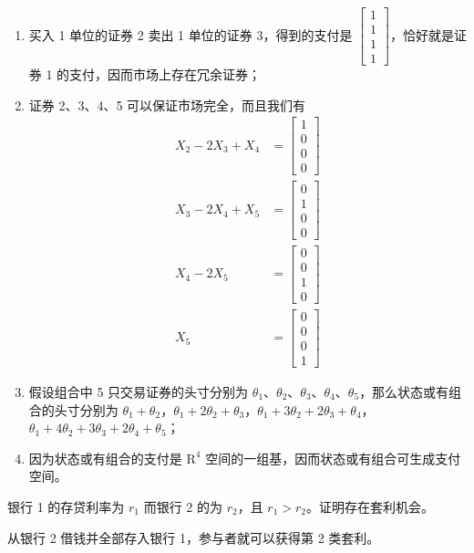 \begin{solution}
\begin{enumerate}[label=(\alph*)]
    \item 买入 1 单位的证券 2 卖出 1 单位的证券 3，得到的支付是 $\begin{bmatrix}1 \\ 1 \\ 1 \\ 1\end{bmatrix}$，恰好就是证券 1 的支付，因而市场上存在冗余证券；
    \item 证券 2、3、4、5 可以保证市场完全，而且我们有
    \[
        \begin{aligned}
            X_{2}-2X_{3}+X_{4}&=\begin{bmatrix}1 \\ 0 \\ 0 \\ 0\end{bmatrix}\\
            X_{3}-2X_{4}+X_{5}&=\begin{bmatrix}0 \\ 1 \\ 0 \\ 0\end{bmatrix}\\
            X_{4}-2X_{5}&=\begin{bmatrix}0 \\ 0 \\ 1 \\ 0\end{bmatrix}\\
            X_{5}&=\begin{bmatrix}0 \\ 0 \\ 0 \\ 1\end{bmatrix}
        \end{aligned}
    \]
    \item 假设组合中 5 只交易证券的头寸分别为 $\theta_{1}$、$\theta_{2}$、$\theta_{3}$、$\theta_{4}$、$\theta_{5}$，那么状态或有组合的头寸分别为 $\theta_{1}+\theta_{2}$，$\theta_{1}+2\theta_{2}+\theta_{3}$，$\theta_{1}+3\theta_{2}+2\theta_{3}+\theta_{4}$，$\theta_{1}+4\theta_{2}+3\theta_{3}+2\theta_{4}+\theta_{5}$；
    \item 因为状态或有组合的支付是 $\mathrm{R}^{4}$ 空间的一组基，因而状态或有组合可生成支付空间。
\end{enumerate}
\end{solution}

\begin{problem}
 银行 1 的存贷利率为 $r_{1}$ 而银行 2 的为 $r_{2}$，且 $r_{1}>r_{2}$。证明存在套利机会。
\end{problem}
\begin{solution}
从银行 2 借钱并全部存入银行 1，参与者就可以获得第 2 类套利。
\end{solution}

